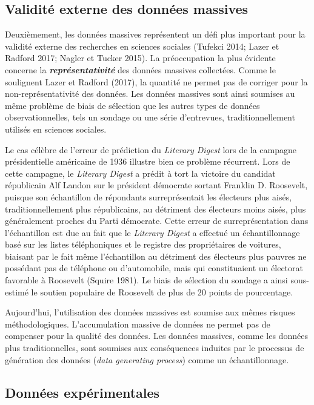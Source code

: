 \documentclass[
  letterpaper,
]{scrbook}
\begin{document}
\hypertarget{validituxe9-externe-des-donnuxe9es-massives}{%
\subsection{Validité externe des données
massives}\label{validituxe9-externe-des-donnuxe9es-massives}}

Deuxièmement, les données massives représentent un défi plus important
pour la validité externe des recherches en sciences sociales (Tufekci
2014; Lazer et Radford 2017; Nagler et Tucker 2015). La préoccupation la
plus évidente concerne la \textbf{\emph{représentativité}} des données
massives collectées. Comme le soulignent Lazer et Radford (2017), la
quantité ne permet pas de corriger pour la non-représentativité des
données. Les données massives sont ainsi soumises au même problème de
biais de sélection que les autres types de données observationnelles,
tels un sondage ou une série d'entrevues, traditionnellement utilisés en
sciences sociales.

Le cas célèbre de l'erreur de prédiction du \emph{Literary Digest} lors
de la campagne présidentielle américaine de 1936 illustre bien ce
problème récurrent. Lors de cette campagne, le \emph{Literary Digest} a
prédit à tort la victoire du candidat républicain Alf Landon sur le
président démocrate sortant Franklin D. Roosevelt, puisque son
échantillon de répondants surreprésentait les électeurs plus aisés,
traditionnellement plus républicains, au détriment des électeurs moins
aisés, plus généralement proches du Parti démocrate. Cette erreur de
surreprésentation dans l'échantillon est due au fait que le
\emph{Literary Digest} a effectué un échantillonnage basé sur les listes
téléphoniques et le registre des propriétaires de voitures, biaisant par
le fait même l'échantillon au détriment des électeurs plus pauvres ne
possédant pas de téléphone ou d'automobile, mais qui constituaient un
électorat favorable à Roosevelt (Squire 1981). Le biais de sélection du
sondage a ainsi sous-estimé le soutien populaire de Roosevelt de plus de
20 points de pourcentage.

Aujourd'hui, l'utilisation des données massives est soumise aux mêmes
risques méthodologiques. L'accumulation massive de données ne permet pas
de compenser pour la qualité des données. Les données massives, comme
les données plus traditionnelles, sont soumises aux conséquences
induites par le processus de génération des données (\emph{data
generating process}) comme un échantillonnage.

\hypertarget{donnuxe9es-expuxe9rimentales}{%
\subsection{Données expérimentales}\label{donnuxe9es-expuxe9rimentales}}
\end{document}
